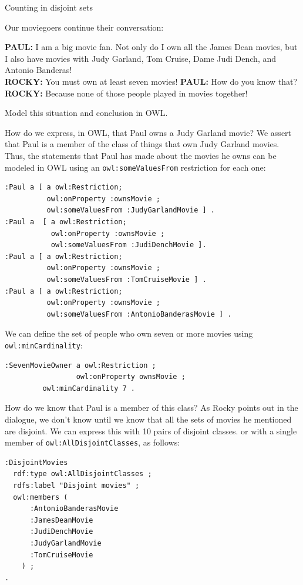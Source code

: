\begin{challenge}{Counting in disjoint sets}
\label{chal:36}

Our moviegoers continue their conversation:

\textbf{PAUL:} I am a big movie fan. Not only do I own all the James Dean
movies, but I also have movies with Judy Garland, Tom Cruise, Dame Judi
Dench, and Antonio Banderas! \\
\textbf{ROCKY:} You must own at least seven movies! 
\textbf{PAUL:} How do you know that? \\
\textbf{ROCKY:} Because none of those people played in movies together!

Model this situation and conclusion in OWL.

\solution

How do we express, in OWL, that Paul owns a Judy Garland movie? We
assert that Paul is a member of the class of things that own Judy
Garland movies. Thus, the statements that Paul has made about the movies
he owns can be modeled in OWL using an \texttt{owl:someValuesFrom} restriction
for each one:

\begin{lstlisting}
:Paul a [ a owl:Restriction;
          owl:onProperty :ownsMovie ;
          owl:someValuesFrom :JudyGarlandMovie ] .
:Paul a  [ a owl:Restriction;
           owl:onProperty :ownsMovie ;
           owl:someValuesFrom :JudiDenchMovie ].
:Paul a [ a owl:Restriction;
          owl:onProperty :ownsMovie ;
          owl:someValuesFrom :TomCruiseMovie ] .
:Paul a [ a owl:Restriction;
          owl:onProperty :ownsMovie ;
          owl:someValuesFrom :AntonioBanderasMovie ] .
\end{lstlisting}

We can define the set of people who own seven or more movies using
\texttt{owl:minCardinality}:

\begin{lstlisting}
:SevenMovieOwner a owl:Restriction ; 
                 owl:onProperty ownsMovie ;
		 owl:minCardinality 7 .
\end{lstlisting}

How do we know that Paul is a member of this class? As Rocky points out
in the dialogue, we don't know until we know that all the sets of movies
he mentioned are disjoint. We can express this with 10 pairs of disjoint classes. or with a
single member of \texttt{owl:AllDisjointClasses}, as follows:

\begin{lstlisting}
:DisjointMovies
  rdf:type owl:AllDisjointClasses ;
  rdfs:label "Disjoint movies" ;
  owl:members (
      :AntonioBanderasMovie
      :JamesDeanMovie
      :JudiDenchMovie
      :JudyGarlandMovie
      :TomCruiseMovie
    ) ;
.
\end{lstlisting}



\end{challenge}
